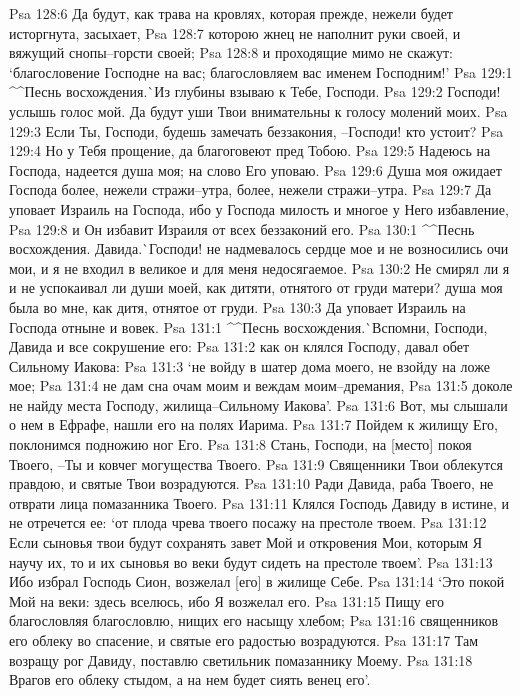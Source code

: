 Psa 128:6  Да будут, как трава на кровлях, которая прежде, нежели будет исторгнута, засыхает,
Psa 128:7  которою жнец не наполнит руки своей, и вяжущий снопы--горсти своей;
Psa 128:8  и проходящие мимо не скажут: `благословение Господне на вас; благословляем вас именем Господним!'
Psa 129:1  ^^Песнь восхождения.^^ Из глубины взываю к Тебе, Господи.
Psa 129:2  Господи! услышь голос мой. Да будут уши Твои внимательны к голосу молений моих.
Psa 129:3  Если Ты, Господи, будешь замечать беззакония, --Господи! кто устоит?
Psa 129:4  Но у Тебя прощение, да благоговеют пред Тобою.
Psa 129:5  Надеюсь на Господа, надеется душа моя; на слово Его уповаю.
Psa 129:6  Душа моя ожидает Господа более, нежели стражи--утра, более, нежели стражи--утра.
Psa 129:7  Да уповает Израиль на Господа, ибо у Господа милость и многое у Него избавление,
Psa 129:8  и Он избавит Израиля от всех беззаконий его.
Psa 130:1  ^^Песнь восхождения. Давида.^^ Господи! не надмевалось сердце мое и не возносились очи мои, и я не входил в великое и для меня недосягаемое.
Psa 130:2  Не смирял ли я и не успокаивал ли души моей, как дитяти, отнятого от груди матери? душа моя была во мне, как дитя, отнятое от груди.
Psa 130:3  Да уповает Израиль на Господа отныне и вовек.
Psa 131:1  ^^Песнь восхождения.^^ Вспомни, Господи, Давида и все сокрушение его:
Psa 131:2  как он клялся Господу, давал обет Сильному Иакова:
Psa 131:3  `не войду в шатер дома моего, не взойду на ложе мое;
Psa 131:4  не дам сна очам моим и веждам моим--дремания,
Psa 131:5  доколе не найду места Господу, жилища--Сильному Иакова'.
Psa 131:6  Вот, мы слышали о нем в Ефрафе, нашли его на полях Иарима.
Psa 131:7  Пойдем к жилищу Его, поклонимся подножию ног Его.
Psa 131:8  Стань, Господи, на [место] покоя Твоего, --Ты и ковчег могущества Твоего.
Psa 131:9  Священники Твои облекутся правдою, и святые Твои возрадуются.
Psa 131:10  Ради Давида, раба Твоего, не отврати лица помазанника Твоего.
Psa 131:11  Клялся Господь Давиду в истине, и не отречется ее: `от плода чрева твоего посажу на престоле твоем.
Psa 131:12  Если сыновья твои будут сохранять завет Мой и откровения Мои, которым Я научу их, то и их сыновья во веки будут сидеть на престоле твоем'.
Psa 131:13  Ибо избрал Господь Сион, возжелал [его] в жилище Себе.
Psa 131:14  `Это покой Мой на веки: здесь вселюсь, ибо Я возжелал его.
Psa 131:15  Пищу его благословляя благословлю, нищих его насыщу хлебом;
Psa 131:16  священников его облеку во спасение, и святые его радостью возрадуются.
Psa 131:17  Там возращу рог Давиду, поставлю светильник помазаннику Моему.
Psa 131:18  Врагов его облеку стыдом, а на нем будет сиять венец его'.
